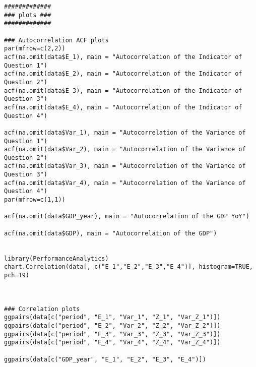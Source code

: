 \begin{lstlisting}
#############
### plots ###
#############

### Autocorrelation ACF plots
par(mfrow=c(2,2))
acf(na.omit(data$E_1), main = "Autocorrelation of the Indicator of Question 1")
acf(na.omit(data$E_2), main = "Autocorrelation of the Indicator of Question 2")
acf(na.omit(data$E_3), main = "Autocorrelation of the Indicator of Question 3")
acf(na.omit(data$E_4), main = "Autocorrelation of the Indicator of Question 4")

acf(na.omit(data$Var_1), main = "Autocorrelation of the Variance of Question 1")
acf(na.omit(data$Var_2), main = "Autocorrelation of the Variance of Question 2")
acf(na.omit(data$Var_3), main = "Autocorrelation of the Variance of Question 3")
acf(na.omit(data$Var_4), main = "Autocorrelation of the Variance of Question 4")
par(mfrow=c(1,1))

acf(na.omit(data$GDP_year), main = "Autocorrelation of the GDP YoY")

acf(na.omit(data$GDP), main = "Autocorrelation of the GDP")


library(PerformanceAnalytics)
chart.Correlation(data[, c("E_1","E_2","E_3","E_4")], histogram=TRUE, pch=19)



### Correlation plots
ggpairs(data[c("period", "E_1", "Var_1", "Z_1", "Var_Z_1")])
ggpairs(data[c("period", "E_2", "Var_2", "Z_2", "Var_Z_2")])
ggpairs(data[c("period", "E_3", "Var_3", "Z_3", "Var_Z_3")])
ggpairs(data[c("period", "E_4", "Var_4", "Z_4", "Var_Z_4")])

ggpairs(data[c("GDP_year", "E_1", "E_2", "E_3", "E_4")])




\end{lstlisting}